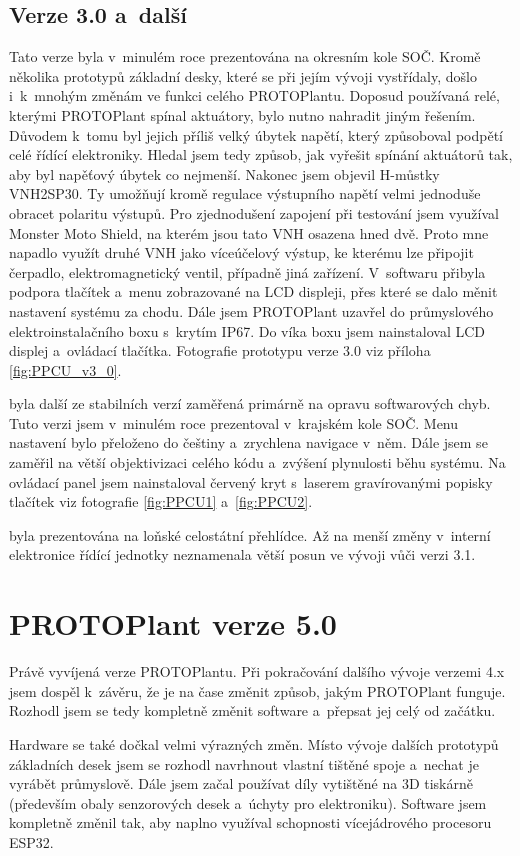 \subsection{Verze 3.0 a~další}
Tato verze byla v~minulém roce prezentována na okresním kole SOČ.
Kromě několika prototypů základní desky, které se při jejím vývoji vystřídaly, došlo i~k~mnohým změnám ve funkci celého PROTOPlantu.
Doposud používaná relé, kterými PROTOPlant spínal aktuátory, bylo nutno nahradit jiným řešením.
Důvodem k~tomu byl jejich příliš velký úbytek napětí, který způsoboval podpětí celé řídící elektroniky.
Hledal jsem tedy způsob, jak vyřešit spínání aktuátorů tak, aby byl napěťový úbytek co nejmenší.
Nakonec jsem objevil H-můstky VNH2SP30. 
Ty umožňují kromě regulace výstupního napětí velmi jednoduše obracet polaritu výstupů.
Pro zjednodušení zapojení při testování jsem využíval Monster Moto Shield, na kterém jsou tato VNH osazena hned dvě.
Proto mne napadlo využít druhé VNH jako víceúčelový výstup, ke kterému lze připojit čerpadlo, elektromagnetický ventil, případně jiná zařízení.
V~softwaru přibyla podpora tlačítek a~menu zobrazované na LCD displeji, přes které se dalo měnit nastavení systému za chodu.
Dále jsem PROTOPlant uzavřel do průmyslového elektroinstalačního boxu s~krytím IP67.
Do víka boxu jsem nainstaloval LCD displej a~ovládací tlačítka.
Fotografie prototypu verze 3.0 viz příloha \ref{fig:PPCU_v3_0}.
\newline

\noindent{} byla další ze stabilních verzí zaměřená primárně na opravu softwarových chyb.
Tuto verzi jsem v~minulém roce prezentoval v~krajském kole SOČ.
Menu nastavení bylo přeloženo do češtiny a~zrychlena navigace v~něm.
Dále jsem se zaměřil na větší objektivizaci celého kódu a~zvýšení plynulosti běhu systému.
Na ovládací panel jsem nainstaloval červený kryt s~laserem gravírovanými popisky tlačítek viz fotografie \ref{fig:PPCU1} a~\ref{fig:PPCU2}.
\newline

\noindent{} byla prezentována na loňské celostátní přehlídce.
Až na menší změny v~interní elektronice řídící jednotky neznamenala větší posun ve vývoji vůči verzi 3.1.

\section{PROTOPlant verze 5.0}
Právě vyvíjená verze PROTOPlantu.
Při pokračování dalšího vývoje verzemi 4.x jsem dospěl k~závěru, že je na čase změnit způsob, jakým PROTOPlant funguje.
Rozhodl jsem se tedy kompletně změnit software a~přepsat jej celý od začátku.

Hardware se také dočkal velmi výrazných změn.
Místo vývoje dalších prototypů základních desek jsem se rozhodl navrhnout vlastní tištěné spoje a~nechat je vyrábět průmyslově.
Dále jsem začal používat díly vytištěné na 3D tiskárně (především obaly senzorových desek a~úchyty pro elektroniku).
Software jsem kompletně změnil tak, aby naplno využíval schopnosti vícejádrového procesoru ESP32.

\fxnote[author=PŠ]{\textcolor{mygreen}{Možná přidat něco dalšího k~verzi 5.0?}}

\newpage